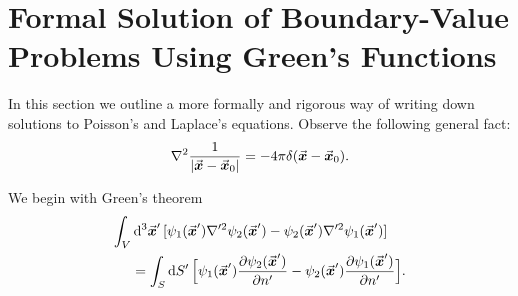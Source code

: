 \chapter{Formal Solution of Boundary-Value Problems Using Green's Functions}

In this section we outline a more formally and rigorous way of writing down solutions to Poisson's and Laplace's equations.
Observe the following general fact:
\begin{align}
    \laplacian \frac{1}{|\va*{x} - \va*{x}_{0}|} = -4 \pi \delta(\va*{x} - \va*{x}_{0})
.\end{align}

We begin with Green's theorem
\begin{align}
    \int_{V} &\dd[3]{\va*{x}'} [ \psi_1(\va*{x}') \nabla'^2 \psi_2(\va*{x}') - \psi_2(\va*{x}') \nabla'^2 \psi_1(\va*{x}') ] \nonumber \\
             &= \int_{S} \dd{S'} \Big[ \psi_1(\va*{x}') \pdv{\psi_2(\va*{x}')}{n'} - \psi_2(\va*{x}') \pdv{\psi_1(\va*{x}')}{n'} \Big]
.\end{align}

